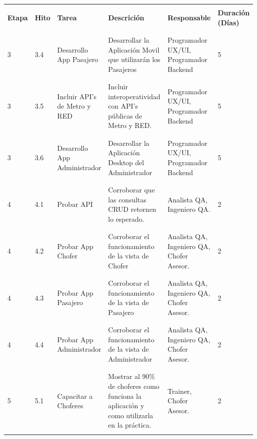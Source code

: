 \documentclass[12pt]{article}
\begin{document}
\newpage
\begin{table}[!h]
    \centering
    \begin{tabular}{|p{1.2cm}|p{1cm}|p{2cm}|p{5cm}|p{3cm}|p{2cm}|}
         \hline
         &&&&&\\
         \textbf{Etapa} & \textbf{Hito} & \textbf{Tarea} & \textbf{Descrición} & \textbf{Responsable} & \textbf{Duración (Días)}  \\
         &&&&&\\
         \hline
         &&&&&\\
         3 & 3.4 & Desarrollo App Pasajero & Desarrollar la Aplicación Movil que utilizarán los Pasajeros & Programador UX/UI, Programador Backend & 5 \\
         &&&&&\\
         \hline
         &&&&&\\
         3 & 3.5 & Incluir API's de Metro y RED & Incluir interoperatividad con API's públicas de Metro y RED. & Programador UX/UI, Programador Backend & 5 \\
         &&&&&\\
         \hline
         &&&&&\\
         3 & 3.6 & Desarrollo App Administrador & Desarrollar la Aplicación Desktop del Administrador & Programador UX/UI, Programador Backend & 5 \\
         &&&&&\\
         \hline
         &&&&&\\
         4 & 4.1 & Probar API & Corroborar que las consultas CRUD retornen lo esperado. & Analista QA, Ingeniero QA. & 2\\
         &&&&&\\
         \hline
         &&&&&\\
         4 & 4.2 & Probar App Chofer & Corroborar el funcionamiento de la vista de Chofer & Analista QA, Ingeniero QA, Chofer Asesor. & 2 \\
         &&&&&\\
         \hline
         &&&&&\\
         4 & 4.3 & Probar App Pasajero & Corroborar el funcionamiento de la vista de Pasajero & Analista QA, Ingeniero QA, Chofer Asesor. & 2 \\
         &&&&&\\
         \hline
         &&&&&\\
         4 & 4.4 & Probar App Administrador & Corroborar el funcionamiento de la vista de Administrador & Analista QA, Ingeniero QA, Chofer Asesor. & 2\\
         &&&&&\\
         \hline
         &&&&&\\
         5 & 5.1 & Capacitar a Choferes & Mostrar al 90\% de choferes como funciona la aplicación y como utilizarla en la práctica. & Trainer, Chofer Asesor. & 2 \\
         &&&&&\\
         \hline
    \end{tabular} 
\end{table}
\end{document}

